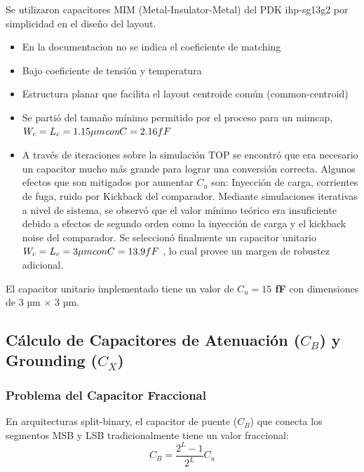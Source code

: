 \documentclass[12pt,a4paper]{report}
\begin{document}
Se utilizaron capacitores MIM (Metal-Insulator-Metal) del PDK ihp-sg13g2 por simplicidad en el diseño del layout.
\begin{itemize}
    \item En la documentacion no se indica el coeficiente de matching
    \item Bajo coeficiente de tensión y temperatura
    \item Estructura planar que facilita el layout centroide común (common-centroid)
    \item Se partió del tamaño mínimo permitido por el proceso para un mimcap, $W_c=L_c=1.15\mu m \space \space \textit{con} \space\space C=2.16fF$
    \item A través de iteraciones sobre la simulación TOP se encontró que era necesario un capacitor mucho más grande para lograr una conversión correcta. Algunos efectos que son mitigados por aumentar $C_u$ son: Inyección de carga, corrientes de fuga, ruido por Kickback del comparador. Mediante simulaciones iterativas a nivel de sistema, se observó que el valor mínimo teórico era insuficiente debido a efectos de segundo orden como la inyección de carga y el kickback noise del comparador. Se seleccionó finalmente un capacitor unitario $W_c=L_c=3\mu m \space \space con \space \space C=13.9fF$ , lo cual provee un margen de robustez adicional.
    
\end{itemize}

El capacitor unitario implementado tiene un valor de \textbf{$C_u = 15$ fF} con dimensiones de 3 µm × 3 µm.








\subsection{Cálculo de Capacitores de Atenuación ($C_B$) y Grounding ($C_X$)}

\subsubsection{Problema del Capacitor Fraccional}

En arquitecturas split-binary, el capacitor de puente ($C_B$) que conecta los segmentos MSB y LSB tradicionalmente tiene un valor fraccional:
\begin{equation}
C_B = \frac{2^L - 1}{2^L} C_u
\end{equation}
\end{document}
